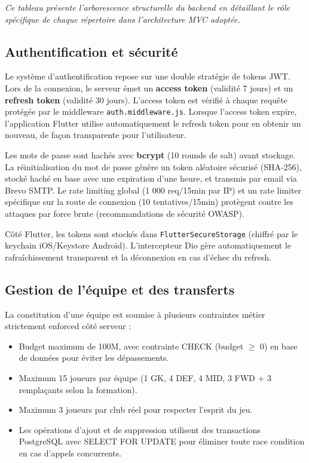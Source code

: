 \vspace{0.2cm}
\noindent\small\textit{Ce tableau présente l'arborescence structurelle du backend en détaillant le rôle spécifique de chaque répertoire dans l'architecture MVC adoptée.}\normalsize

\subsection{Authentification et sécurité}

Le système d'authentification repose sur une double stratégie de tokens JWT. Lors de la connexion, le serveur émet un \textbf{access token} (validité 7 jours) et un \textbf{refresh token} (validité 30 jours). L'access token est vérifié à chaque requête protégée par le middleware \texttt{auth.middleware.js}. Lorsque l'access token expire, l'application Flutter utilise automatiquement le refresh token pour en obtenir un nouveau, de façon transparente pour l'utilisateur.

Les mots de passe sont hachés avec \textbf{bcrypt} (10 rounds de salt) avant stockage. La réinitialisation du mot de passe génère un token aléatoire sécurisé (SHA-256), stocké haché en base avec une expiration d'une heure, et transmis par email via Brevo SMTP. Le rate limiting global (1 000 req/15min par IP) et un rate limiter spécifique sur la route de connexion (10 tentatives/15min) protègent contre les attaques par force brute (recommandations de sécurité OWASP\cite{owasp}).

Côté Flutter, les tokens sont stockés dans \texttt{FlutterSecureStorage} (chiffré par le keychain iOS/Keystore Android). L'intercepteur Dio gère automatiquement le rafraîchissement transparent et la déconnexion en cas d'échec du refresh.

\subsection{Gestion de l'équipe et des transferts}

La constitution d'une équipe est soumise à plusieurs contraintes métier strictement enforced côté serveur :

\begin{itemize}
    \item Budget maximum de 100M, avec contrainte CHECK (budget $\geq$ 0) en base de données pour éviter les dépassements.
    \item Maximum 15 joueurs par équipe (1 GK, 4 DEF, 4 MID, 3 FWD + 3 remplaçants selon la formation).
    \item Maximum 3 joueurs par club réel pour respecter l'esprit du jeu.
    \item Les opérations d'ajout et de suppression utilisent des transactions PostgreSQL avec SELECT FOR UPDATE pour éliminer toute race condition en cas d'appels concurrents.
\end{itemize}

